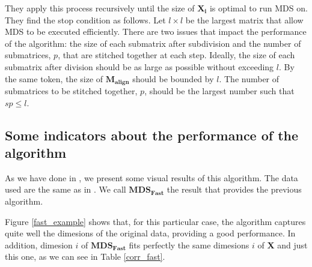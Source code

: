 \documentclass[11pt]{report}
\begin{document}
\indent They apply this process recursively until the size of $\mathbf{X_i}$ is
optimal to run MDS on. They find the stop condition as follows. Let 
$l \times l$ be the largest matrix that allow MDS to be executed efficiently. 
There are two issues that impact the performance of the algorithm: the size of 
each submatrix after subdivision and the number of submatrices, $p$, that are 
stitched together at each step. Ideally, the size of each submatrix after 
division should be as large as possible without exceeding $l$. By the same
token, the size of $\mathbf{M_{align}}$ should be bounded by $l$. The number of 
submatrices to be stitched together, $p$, should be the largest number such 
that $sp \leq l$.

\subsection{Some indicators about the performance of the algorithm}
As we have done in , we present some visual results of
this algorithm. The data used are the same as in . We
call $\mathbf{MDS_{Fast}}$ the result that provides the previous algorithm.

\indent Figure \ref{fast_example} shows that, for this particular case,
the algorithm captures quite well the dimesions of the original data, 
providing a good performance. In addition, dimesion $i$ of 
$\mathbf{MDS_{Fast}}$ fits perfectly the same dimesions $i$ of \textbf{X} and 
just this one, as we can see in Table \ref{corr_fast}.
\end{document}
